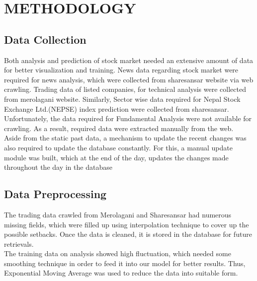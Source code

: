 \section{METHODOLOGY}
\subsection{Data Collection}
Both analysis and prediction of stock market needed an extensive amount of data for better visualization and training. News data regarding stock market were required for news analysis, which were collected from sharesansar website via web crawling. Trading data of listed companies, for technical analysis were collected from merolagani website. Similarly, Sector wise data required for Nepal Stock Exchange Ltd.(NEPSE)  index prediction were collected from sharesansar. Unfortunately, the data required for Fundamental Analysis were not available for crawling. As a result, required data were extracted manually from the web.\\

Aside from the static past data, a mechanism to update the recent changes was also required to update the database constantly. For this, a manual update module was built, which at the end of the day, updates the changes made throughout the day in the database

\subsection{Data Preprocessing}
The trading data crawled from Merolagani and Sharesansar had numerous missing fields, which were  filled up using interpolation technique to cover up the possible setbacks. Once the data is cleaned, it is stored in the database for future retrievals.\\

The training data on analysis showed high fluctuation, which needed some smoothing technique in order to feed it into our model for better results. Thus, Exponential Moving Average was used to reduce the data into suitable form.\\


